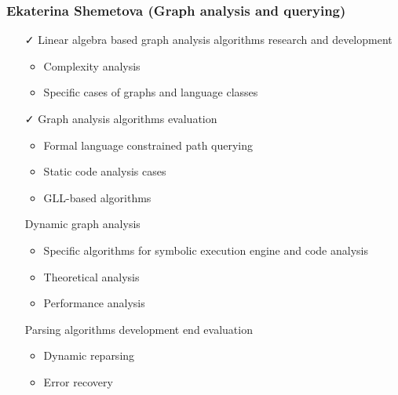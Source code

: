 \documentclass[xcolor=table,aspectratio=169]{beamer}
\begin{document}
\begin{frame}[fragile]
  \frametitle{Ekaterina Shemetova (Graph analysis and querying)}
  \begin{minipage}[t]{0.48\textwidth}
    \begin{itemize}
      \item[\faCheck] Linear algebra based graph analysis algorithms research and development 
      \begin{itemize}
        \item Complexity analysis
        \item Specific cases of graphs and language classes        
      \end{itemize}
      \item[\faCheck] Graph analysis algorithms evaluation
      \begin{itemize}
        \item Formal language constrained path querying
        \item Static code analysis cases
        \item GLL-based algorithms
      \end{itemize}            
    \end{itemize}
  \end{minipage}
  \pause
  \begin{minipage}[t]{0.48\textwidth}
    \begin{itemize}
      \item[\faHourglassHalf] Dynamic graph analysis
      \begin{itemize}
        \item Specific algorithms for symbolic execution engine and code analysis
        \item Theoretical analysis
        \item Performance analysis        
      \end{itemize}      
      \item[\faHourglassHalf] Parsing algorithms development end evaluation
      \begin{itemize}
        \item Dynamic reparsing
        \item Error recovery        
      \end{itemize}      
    \end{itemize}
  \end{minipage}
\end{frame}
\end{document}
